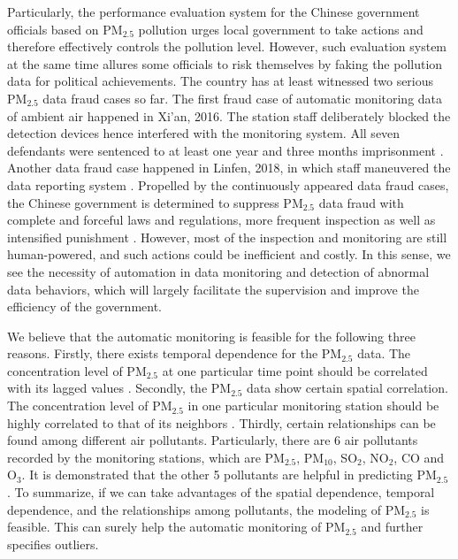 \documentclass[12pt]{article}
\numberwithin{equation}{section}
\begin{document}
Particularly, the performance evaluation system for the Chinese government officials based on PM$_{2.5}$ pollution urges local government to take actions and therefore effectively controls the pollution level. However, such evaluation system at the same time allures some officials to risk themselves by faking the pollution data for political achievements. The country has at least witnessed two serious PM$_{2.5}$ data fraud cases so far. The first fraud case of automatic monitoring data of ambient air happened in Xi'an, 2016. The station staff deliberately blocked the detection devices hence interfered with the monitoring system. All seven defendants were sentenced to at least one year and three months imprisonment \citep{web8}. Another data fraud case happened in Linfen, 2018, in which staff maneuvered the data reporting system \citep{web9}. Propelled by the continuously appeared data fraud cases, the Chinese government is determined to suppress PM$_{2.5}$ data fraud with complete and forceful laws and regulations, more frequent inspection as well as intensified punishment \citep{web11}. However, most of the inspection and monitoring are still human-powered, and such actions could be inefficient and costly. In this sense, we see the necessity of automation in data monitoring and detection of abnormal data behaviors, which will largely facilitate the supervision and improve the efficiency of the government.

We believe that the automatic monitoring is feasible for the following three reasons. Firstly, there exists temporal dependence for the PM$_{2.5}$ data. The concentration level of PM$_{2.5}$ at one particular time point should be correlated with its lagged values \citep{supporttemporal2,supporttemporal1}. Secondly, the PM$_{2.5}$ data show certain spatial correlation. The concentration level of PM$_{2.5}$ in one particular monitoring station should be highly correlated to that of its neighbors \citep{airflow}. Thirdly, certain relationships can be found among different air pollutants. Particularly, there are 6 air pollutants recorded by the monitoring stations, which are PM$_{2.5}$, PM$_{10}$, SO$_2$, NO$_2$, CO and O$_3$. It is demonstrated that the other 5 pollutants are helpful in predicting PM$_{2.5}$ \citep{supportcontent}. To summarize, if we can take advantages of the spatial dependence, temporal dependence, and the relationships among pollutants, the modeling of PM$_{2.5}$ is feasible. This can surely help the automatic monitoring of PM$_{2.5}$ and further specifies outliers.
\end{document}
